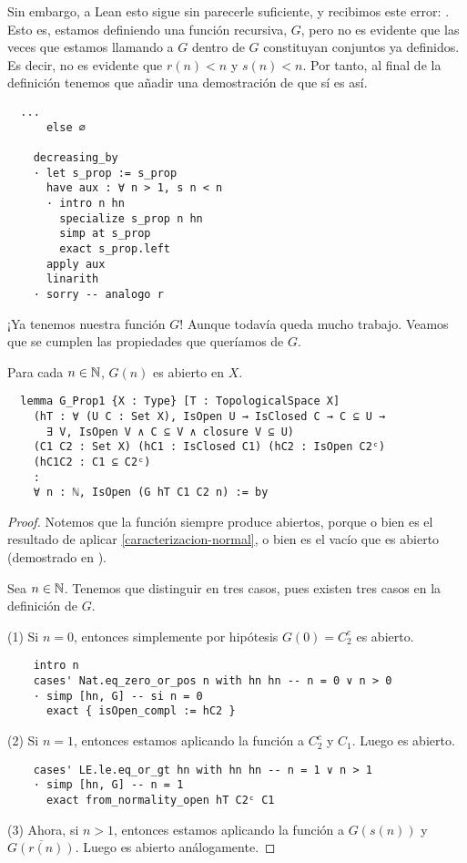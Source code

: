 Sin embargo, a Lean esto sigue sin parecerle suficiente, y recibimos este error: . Esto es, estamos definiendo una función recursiva, $G$, pero no es evidente que las veces que estamos llamando a $G$ dentro de $G$ constituyan conjuntos ya definidos. Es decir, no es evidente que $r(n) < n$ y $s(n) < n$. Por tanto, al final de la definición tenemos que añadir una demostración de que sí es así.

\begin{lstlisting}
  ...
      else ∅

    decreasing_by
    · let s_prop := s_prop
      have aux : ∀ n > 1, s n < n
      · intro n hn
        specialize s_prop n hn
        simp at s_prop
        exact s_prop.left
      apply aux
      linarith
    · sorry -- analogo r
\end{lstlisting}

¡Ya tenemos nuestra función $G$! Aunque todavía queda mucho trabajo. Veamos que se cumplen las propiedades que queríamos de $G$.

\begin{lemma}\label{prop:G-open}
  Para cada $n \in \mathbb{N}$, $G(n)$ es abierto en $X$.
\end{lemma}

\begin{lstlisting}
  lemma G_Prop1 {X : Type} [T : TopologicalSpace X]
    (hT : ∀ (U C : Set X), IsOpen U → IsClosed C → C ⊆ U →
      ∃ V, IsOpen V ∧ C ⊆ V ∧ closure V ⊆ U)
    (C1 C2 : Set X) (hC1 : IsClosed C1) (hC2 : IsOpen C2ᶜ)
    (hC1C2 : C1 ⊆ C2ᶜ)
    :
    ∀ n : ℕ, IsOpen (G hT C1 C2 n) := by 
\end{lstlisting}

\begin{proof}
  Notemos que la función  siempre produce abiertos, porque o bien es el resultado de aplicar \ref{caracterizacion-normal}, o bien es el vacío que es abierto (demostrado en ).

  Sea $n \in \mathbb{N}$. Tenemos que distinguir en tres casos, pues existen tres casos en la definición de $G$.

  (1) Si $n = 0$, entonces simplemente por hipótesis $G(0) = C_2^c$ es abierto.

  \begin{lstlisting}
    intro n
    cases' Nat.eq_zero_or_pos n with hn hn -- n = 0 ∨ n > 0
    · simp [hn, G] -- si n = 0
      exact { isOpen_compl := hC2 } \end{lstlisting}

  (2) Si $n = 1$, entonces estamos aplicando la función  a $C_2^c$ y $C_1$. Luego es abierto.

  \begin{lstlisting}
    cases' LE.le.eq_or_gt hn with hn hn -- n = 1 ∨ n > 1
    · simp [hn, G] -- n = 1
      exact from_normality_open hT C2ᶜ C1 \end{lstlisting}

  (3) Ahora, si $n > 1$, entonces estamos aplicando la función  a $G(s(n))$ y $\overline{G(r(n))}$. Luego es abierto análogamente.
\end{proof}

